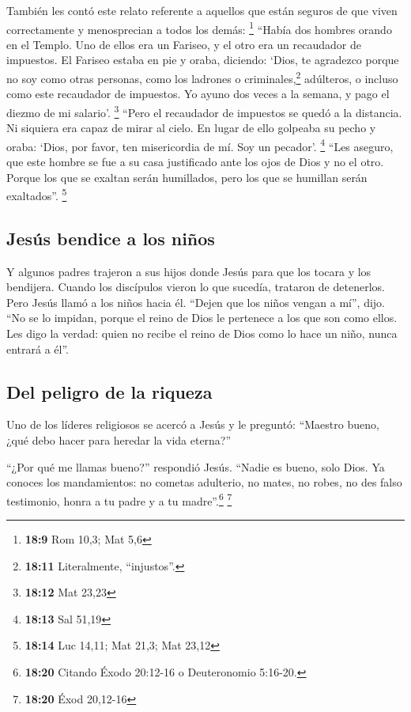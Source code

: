  También les contó este relato referente a aquellos que
están seguros de que viven correctamente y menosprecian a todos los
demás: \footnote{\textbf{18:9} Rom 10,3; Mat 5,6} 
``Había dos hombres orando en el Templo. Uno de ellos era un Fariseo, y
el otro era un recaudador de impuestos.  El Fariseo
estaba en pie y oraba, diciendo: `Dios, te agradezco porque no soy como
otras personas, como los ladrones o criminales,\footnote{\textbf{18:11}
  Literalmente, ``injustos''.} adúlteros, o incluso como este recaudador
de impuestos.  Yo ayuno dos veces a la semana, y pago el
diezmo de mi salario'. \footnote{\textbf{18:12} Mat 23,23}
 ``Pero el recaudador de impuestos se quedó a la
distancia. Ni siquiera era capaz de mirar al cielo. En lugar de ello
golpeaba su pecho y oraba: `Dios, por favor, ten misericordia de mí. Soy
un pecador'. \footnote{\textbf{18:13} Sal 51,19}  ``Les
aseguro, que este hombre se fue a su casa justificado ante los ojos de
Dios y no el otro. Porque los que se exaltan serán humillados, pero los
que se humillan serán exaltados''. \footnote{\textbf{18:14} Luc 14,11;
  Mat 21,3; Mat 23,12}

\hypertarget{jesuxfas-bendice-a-los-niuxf1os}{%
\subsection{Jesús bendice a los
niños}\label{jesuxfas-bendice-a-los-niuxf1os}}

 Y algunos padres trajeron a sus hijos donde Jesús para
que los tocara y los bendijera. Cuando los discípulos vieron lo que
sucedía, trataron de detenerlos.  Pero Jesús llamó a los
niños hacia él. ``Dejen que los niños vengan a mí'', dijo. ``No se lo
impidan, porque el reino de Dios le pertenece a los que son como ellos.
 Les digo la verdad: quien no recibe el reino de Dios
como lo hace un niño, nunca entrará a él''.

\hypertarget{del-peligro-de-la-riqueza}{%
\subsection{Del peligro de la riqueza}\label{del-peligro-de-la-riqueza}}

 Uno de los líderes religiosos se acercó a Jesús y le
preguntó: ``Maestro bueno, ¿qué debo hacer para heredar la vida
eterna?''

 ``¿Por qué me llamas bueno?'' respondió Jesús. ``Nadie
es bueno, solo Dios.  Ya conoces los mandamientos: no
cometas adulterio, no mates, no robes, no des falso testimonio, honra a
tu padre y a tu madre''.\footnote{\textbf{18:20} Citando Éxodo 20:12-16
  o Deuteronomio 5:16-20.} \footnote{\textbf{18:20} Éxod 20,12-16}

